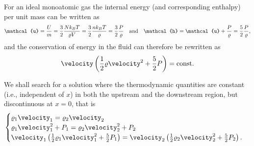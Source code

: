 For an ideal monoatomic gas the internal energy (and corresponding enthalpy) per
unit mass can be written as
\begin{align*}
  \mathcal{u} = \frac{U}{m} = \frac{3}{2} \frac{N\kT}{\density V} =
  \frac{3}{2} \frac{n\kT}{\density} = \frac{3}{2} \frac{\pressure}{\density}
  \quad \text{and} \quad
  \mathcal{h} = \mathcal{u} + \frac{P}{\density} =
  \frac{5}{2} \frac{\pressure}{\density},
\end{align*}
and the conservation of energy in the fluid can therefore be rewritten as
\begin{align*}
  \velocity \left( \frac{1}{2}\density \velocity^2 + \frac{5}{2}\pressure \right)= \text{const}.
\end{align*}

We shall search for a solution where the thermodynamic quantities are constant
(i.e., independent of $x$) in both the upstream and the downstream region, but
discontinuous at $x = 0$, that is
\begin{align}
  \begin{cases}
  \density_1 \velocity_1 =  \density_2 \velocity_2\\
  \density_1 \velocity_1^2 + \pressure_1 = \density_2 \velocity_2^2 + \pressure_2\\
  \velocity_1 \left( \frac{1}{2}\density_1 \velocity_1^2 + \frac{5}{2}\pressure_1 \right) =
  \velocity_2 \left( \frac{1}{2}\density_2 \velocity_2^2 + \frac{5}{2}\pressure_2 \right).
  \end{cases}
\end{align}

